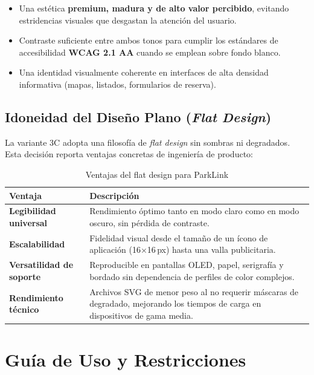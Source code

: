 \documentclass{estilo}
\begin{document}
\begin{itemize}[leftmargin=1.5em, itemsep=0.3em]
  \item Una estética \textbf{premium, madura y de alto valor percibido}, evitando estridencias visuales que desgastan la atención del usuario.
  \item Contraste suficiente entre ambos tonos para cumplir los estándares de accesibilidad \textbf{WCAG 2.1 AA} cuando se emplean sobre fondo blanco.
  \item Una identidad visualmente coherente en interfaces de alta densidad informativa (mapas, listados, formularios de reserva).
\end{itemize}

\subsection{Idoneidad del Diseño Plano (\textit{Flat Design})}

La variante 3C adopta una filosofía de \textit{flat design} sin sombras ni degradados. Esta decisión reporta ventajas concretas de ingeniería de producto:

\vspace{0.3cm}

\begin{table}[H]
\centering
\renewcommand{\arraystretch}{1.8}
\begin{tabularx}{\textwidth}{>{\bfseries}p{4cm} X}
\toprule
Ventaja & Descripción \\
\midrule
Legibilidad universal & Rendimiento óptimo tanto en modo claro como en modo oscuro, sin pérdida de contraste. \\
\rowcolor{lightgray}
Escalabilidad & Fidelidad visual desde el tamaño de un ícono de aplicación (16×16\,px) hasta una valla publicitaria. \\
Versatilidad de soporte & Reproducible en pantallas OLED, papel, serigrafía y bordado sin dependencia de perfiles de color complejos. \\
\rowcolor{lightgray}
Rendimiento técnico & Archivos SVG de menor peso al no requerir máscaras de degradado, mejorando los tiempos de carga en dispositivos de gama media. \\
\bottomrule
\end{tabularx}
\caption{Ventajas del flat design para ParkLink}
\label{tab:flatdesign}
\end{table}

\section{Guía de Uso y Restricciones}
\end{document}
